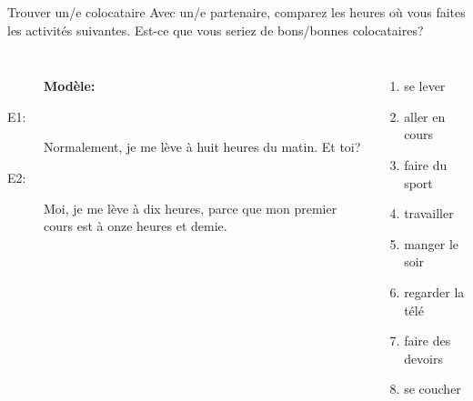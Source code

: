 \documentclass{beamer}
\begin{document}
  \begin{frame}{Trouver un/e colocataire}
    Avec un/e partenaire, comparez les heures où vous faites les activités suivantes.
    Est-ce que vous seriez de bons/bonnes colocataires? \\
    \begin{columns}
        \begin{description}
          \item[] \textbf{Modèle:}
          \item[] 
          \item[E1:] Normalement, je me lève à huit heures du matin. Et toi?
          \item[] 
          \item[E2:] Moi, je me lève à dix heures, parce que mon premier cours est à onze heures et demie.
          \item[] 
        \end{description}
        \small
        \begin{enumerate}
          \item se lever
          \item aller en cours
          \item faire du sport
          \item travailler
          \item manger le soir
          \item regarder la télé
          \item faire des devoirs
          \item se coucher
        \end{enumerate}
    \end{columns}
  \end{frame}
\end{document}
